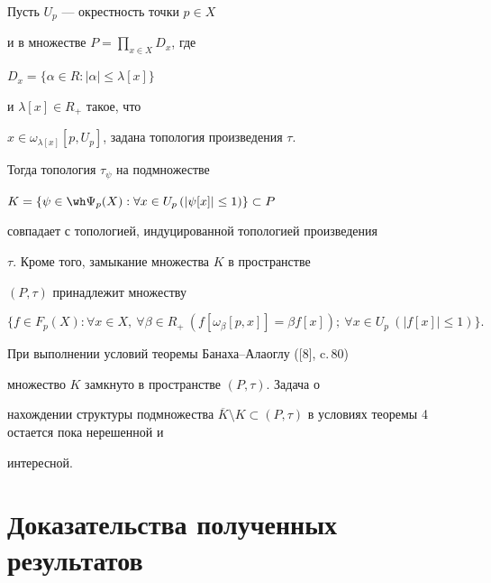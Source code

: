 \begin{thm}


Пусть $U_{p}$ --- окрестность точки $p \in X$


и в множестве $P = \prod \limits_{x \in X} D_{x}$, где


$D_{x} = \{\alpha \in R : |\alpha| \leq \lambda[x] \}$


и $\lambda[x] \in R_{+}$ такое, что


$x \in \omega_{\lambda[x]}[p,U_{p}]$, задана топология произведения $\tau$.


Тогда топология $\tau_{\psi}$ на подмножестве


$K= \{\psi \in \wh \Psi_{p}(X) : \forall x \in U_{p} \, (|\psi[x]| \leq 1 )\} \subset P$


совпадает с топологией, индуцированной топологией произведения


$\tau$. Кроме того, замыкание множества $K$ в пространстве


$(P,\tau)$ принадлежит множеству 


$$


\{ f \in F_{p}(X) : \forall  x \in X, \ \forall \beta \in R_{+}


\ (f[\omega_{\beta }[p,x]] = \beta f[x]); \ \forall x \in U_{p}


\ (|f[x]| \leq 1)\}.


$$


\end{thm}





\begin{notenonum}


При выполнении условий теоремы Банаха--Алаоглу ([8], c.\,80)


множество $K$ замкнуто в пространстве $(P,\tau)$. Задача о


нахождении структуры подмножества $\overline{K}\setminus K


\subset (P,\tau)$ в условиях теоремы 4 остается пока нерешенной и


интересной.


\end{notenonum}








\section{Доказательства полученных результатов}








